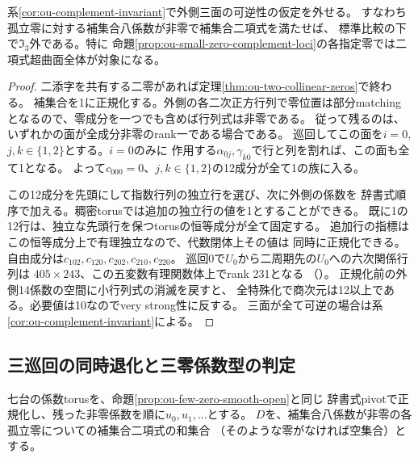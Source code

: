 \begin{proposition}[補集合二項式の特異外側面]
\label{prop:ou-small-zero-entire-binomial}
系\ref{cor:ou-complement-invariant}で外側三面の可逆性の仮定を外せる。
すなわち孤立零に対する補集合八係数が非零で補集合二項式を満たせば、
標準比較の下で$\mathfrak I_3$外である。特に
命題\ref{prop:ou-small-zero-complement-loci}の各指定零では二項式超曲面全体が対象になる。
\end{proposition}
\begin{proof}
二添字を共有する二零があれば定理\ref{thm:ou-two-collinear-zeros}で終わる。
補集合を1に正規化する。外側の各二次正方行列で零位置は部分matching
となるので、零成分を一つでも含めば行列式は非零である。
従って残るのは、いずれかの面が全成分非零のrank一である場合である。
巡回してこの面を$i=0$, $j,k\in\{1,2\}$とする。$i=0$のみに
作用する$\alpha_{0j},\gamma_{k0}$で行と列を割れば、この面も全て1となる。
よって$c_{000}=0$、$j,k\in\{1,2\}$の12成分が全て1の族に入る。

この12成分を先頭にして指数行列の独立行を選び、次に外側の係数を
辞書式順序で加える。稠密torusでは追加の独立行の値を1とすることができる。
既に1の12行は、独立な先頭行を保つtorusの恒等成分が全て固定する。
追加行の指標はこの恒等成分上で有理独立なので、代数閉体上その値は
同時に正規化できる。自由成分は$c_{102},c_{120},c_{202},c_{210},c_{220}$。
巡回0で$U_0$から二周期先の$U_0$への六次関係行列は
$405\times243$、この五変数有理関数体上でrank 231となる
（）。
正規化前の外側14係数の空間に小行列式の消滅を戻すと、
全特殊化で商次元は12以上である。必要値は10なのでvery strong性に反する。
三面が全て可逆の場合は系\ref{cor:ou-complement-invariant}による。
\end{proof}

\subsection{三巡回の同時退化と三零係数型の判定}
\label{subsec:ou-few-zero-cyclic-boundary}
七台の係数torusを、命題\ref{prop:ou-few-zero-smooth-open}と同じ
辞書式pivotで正規化し、残った非零係数を順に$u_0,u_1,\ldots$とする。
$D$を、補集合八係数が非零の各孤立零についての補集合二項式の和集合
（そのような零がなければ空集合）とする。

